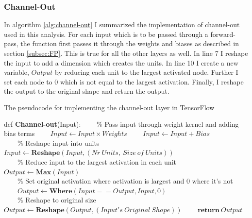 \subsubsection*{Channel-Out}
In algorithm \ref{alg:channel-out} I summarized the implementation of channel-out used in this analysis. For each 
input which is to be passed through a forward-pass, the function first passes it through the weights and biases 
as described in section \ref{subsec:FP}. This is true for all the other layers as well. In line 7 I reshape the input 
to add a dimension which creates the units. In line 10 I create a new variable, $Output$ by reducing each unit to the 
largest activated node. Further I set each node to 0 which is not equal to the largest activation. Finally, I reshape 
the output to the original shape and return the output.  
\begin{algorithm}
    \caption{The pseudocode for implementing the channel-out layer in TensorFlow}\label{alg:channel-out}
    \begin{algorithmic}[1]
    \State def \textbf{Channel-out}(Input): 
    \State \ \ \ \ $\%$ Pass input through weight kernel and adding bias terms
    \State \ \ \ \ $Input \gets Input \times Weights$
    \State \ \ \ \ $Input \gets Input + Bias$
    \\
    \State \ \ \ \ $\%$ Reshape input into units
    \State \ \ \ \ $Input \gets \textbf{Reshape}(Input,(Nr\ Units,\ Size \ of \ Units))$
    \\
    \State \ \ \ \ $\%$ Reduce input to the largest activation in each unit
    \State \ \ \ \ $Output \gets \textbf{Max}(Input)$
    \\
    \State \ \ \ \ $\%$ Set original activation where activation is largest and 0 where it's not
    \State \ \ \ \ $Output \gets \textbf{Where}(Input == Output, Input,0)$
    \\
    \State \ \ \ \ $\%$ Reshape to original size
    \State \ \ \ \ $Output \gets \textbf{Reshape}(Output,(Input's \ Original \ Shape))$
    \State \ \ \ \ $\textbf{return}\ Output$
    \end{algorithmic}
\end{algorithm}
